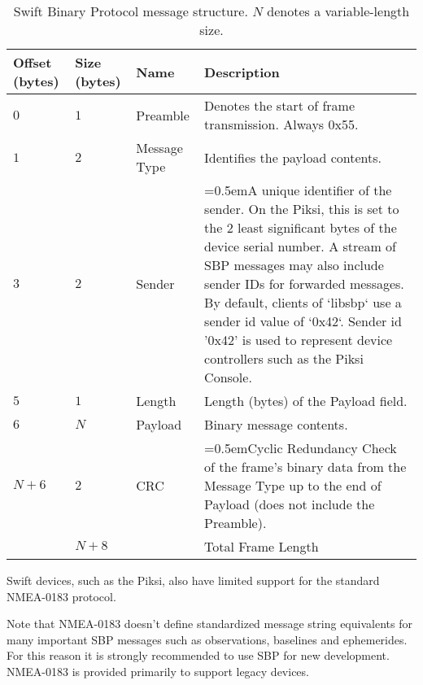 \documentclass{article}
\numberwithin{table}{subsection}
\numberwithin{field}{subsection}
\begin{document}
\begin{table}[h]
  \centering
  \begin{tabularx}{\textwidth}{aaaX}
    \toprule
    Offset (bytes) & Size (bytes) & Name & Description \\
    \midrule
    $0$ & $1$ & {Preamble} & Denotes the start of frame transmission. Always 0x55. \\
    $1$ & $2$ & {Message Type} & Identifies the payload contents. \\
    $3$ & $2$ & {Sender} & \hangindent=0.5em{A unique identifier of the sender. On the Piksi, this is set to the 2 least significant bytes of the device serial number. A stream of SBP messages may also include sender IDs for forwarded messages. By default, clients of `libsbp` use a sender id value of `0x42`.  Sender id '0x42' is used to represent device controllers such as the Piksi Console.} \\
    $5$ & $1$ & {Length} & Length (bytes) of the {Payload} field. \\
    $6$ & $N$ & {Payload} & Binary message contents. \\
    $N+6$ & $2$ & {CRC} & \hangindent=0.5em{Cyclic Redundancy Check of the frame's binary data from the Message Type up to the end of Payload (does not include the Preamble).} \\
    \midrule
    & $N+8$ & &Total Frame Length \\
    \bottomrule
  \end{tabularx}
  \caption{Swift Binary Protocol message structure. $N$ denotes a variable-length size.}
  \label{tab:message}
\end{table}

\begin{large}

Swift devices, such as the Piksi, also have limited support for the standard
NMEA-0183 protocol.

Note that NMEA-0183 doesn't define standardized message
string equivalents for many important SBP messages such as observations,
baselines and ephemerides. For this reason it is strongly recommended to use
SBP for new development. NMEA-0183 is provided primarily to support legacy
devices.

\end{large}

\newpage
\end{document}
